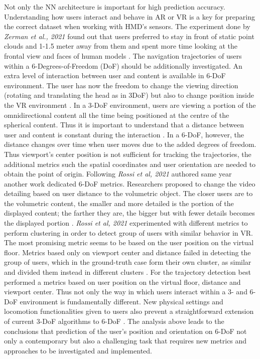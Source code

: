 Not only the NN architecture is important for high prediction accuracy. Understanding how users interact and behave in AR or VR is a key for preparing the correct dataset when working with HMD's sensors. The experiment done by \textit{Zerman et al., 2021} found out that users preferred to stay in front of static point clouds and 1-1.5 meter away from them and spent more time looking at the frontal view and faces of human models \cite{user_behav_volumetric}. The navigation trajectories of users within a 6-Degrees-of-Freedom (DoF) should be additionally investigated. An extra level of interaction between user and content is available in 6-DoF environment. The user has now the freedom to change the viewing direction (rotating and translating the head as in 3DoF) but also to change position inside the VR environment \cite{new_challenge}. In a 3-DoF environment, users are viewing a portion of the omnidirectional content all the time being positioned at the centre of the spherical content. Thus it is important to understand that a distance between user and content is constant during the interaction \cite{new_challenge}. In a 6-DoF, however, the distance changes over time when user moves due to the added degrees of freedom. Thus viewport’s center position is not sufficient for tracking the trajectories, the additional metrics such the spatial coordinates and user orientation are needed to obtain the point of origin. Following \cite{new_challenge} \textit{Rossi et al, 2021} authored same year another work \cite{6-dof_metrics} dedicated 6-DoF metrics. Researchers proposed to change the video detailing based on user distance to the volumetric object. The closer users are to the volumetric content, the smaller and more detailed is the portion of the displayed content; the farther they are, the bigger but with fewer details becomes the displayed portion \cite{6-dof_metrics}. \textit{Rossi et al, 2021} experimented with different metrics to perform clustering in order to detect group of users with similar behavior in VR. The most promising metric seems to be based on the user position on the virtual floor. Metrics based only on viewport center and distance failed in detecting the group of users, which in the ground-truth case form their own cluster, as similar and divided them instead in different clusters \cite{6-dof_metrics}. For the trajectory detection best performed a metrics based on user position on the virtual floor, distance and viewport center. Thus not only the way in which users interact within a 3- and 6-DoF environment is fundamentally different. New physical settings and locomotion functionalities given to users also prevent a straightforward extension of current 3-DoF algorithms to 6-DoF \cite{6-dof_metrics}. The analysis above leads to the conclusions that prediction of the user's position and orientation on 6-DoF not only a contemporary but also a challenging task that requires new metrics and approaches to be investigated and implemented. 